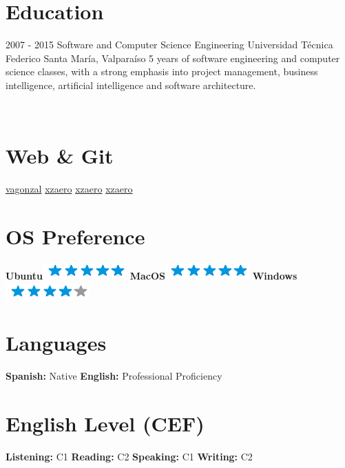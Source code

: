 \documentclass[]{friggeri-cv}
\begin{document}
\section{Education}
\begin{entrylist}
  \entry
    {2007 - 2015}
    {Software and Computer Science Engineering}
    {Universidad Técnica Federico Santa María, Valparaíso}
    {5\+ years of software engineering and computer science classes, with a strong emphasis into project management, business intelligence, artificial intelligence and software architecture.\\}
\end{entrylist}

\newpage

\begin{aside}
~
~
~
  \section{\faNewspaperO\space Web \& Git}
    \href{http://lnked.in/vagonzal}{\faLinkedin\space vagonzal}
    \href{https://github.com/xzaero}{\faGithub\space xzaero}
    \href{https://gitlab.com/xzaero}{\faGitlab\space xzaero}
    \href{http://stackoverflow.com/users/4848018/xzaero}{\faStackOverflow\space xzaero}
    ~
  \section{OS Preference}
    \textbf{Ubuntu}\includegraphics[scale=0.40]{img/5stars.png}
    \textbf{MacOS}\includegraphics[scale=0.40]{img/5stars.png}
    \textbf{Windows}\includegraphics[scale=0.40]{img/4stars.png}
    ~
  \section{Languages}
    \textbf{Spanish:} Native
    \textbf{English:} Professional Proficiency
    ~
  \section{English Level (CEF)}
    \textbf{Listening:} C1
    \textbf{Reading:} C2
	\textbf{Speaking:} C1
	\textbf{Writing:} C2
    ~
\end{aside}
\end{document}
